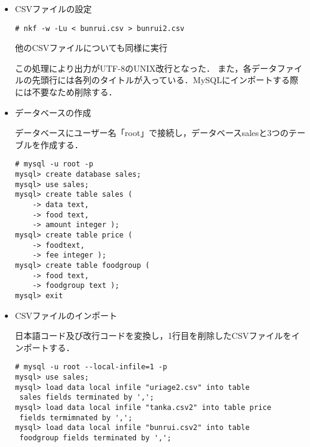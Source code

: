 \documentclass[a4j,titlepage]{jarticle}
\begin{document}
\begin{itemize}
\begin{itemize}
\item CSVファイルの設定

\begin{center}
\begin{screen}
\begin{verbatim}
# nkf -w -Lu < bunrui.csv > bunrui2.csv
\end{verbatim}
他のCSVファイルについても同様に実行
\end{screen}
\end{center}

この処理により出力がUTF-8のUNIX改行となった．
また，各データファイルの先頭行には各列のタイトルが入っている．MySQLにインポートする際には不要なため削除する．

\item データベースの作成

データベースにユーザー名「root」で接続し，データベースsalesと3つのテーブルを作成する．
\begin{center}
\begin{screen}
\begin{verbatim}
# mysql -u root -p
mysql> create database sales;
mysql> use sales;
mysql> create table sales (
    -> data text,
    -> food text,
    -> amount integer );
mysql> create table price (
    -> foodtext,
    -> fee integer );
mysql> create table foodgroup (
    -> food text,
    -> foodgroup text );
mysql> exit
\end{verbatim}
\end{screen}
\end{center}

\item CSVファイルのインポート

日本語コード及び改行コードを変換し，1行目を削除したCSVファイルをインポートする．

\begin{center}
\begin{screen}
\begin{verbatim}
# mysql -u root --local-infile=1 -p
mysql> use sales;
mysql> load data local infile "uriage2.csv" into table
 sales fields terminated by ',';
mysql> load data local infile "tanka.csv2" into table price
 fields termimnated by ',';
mysql> load data local infile "bunrui.csv2" into table
 foodgroup fields terminated by ',';
\end{verbatim}
\end{screen}
\end{center}


\end{itemize}


\end{itemize}
\end{document}
